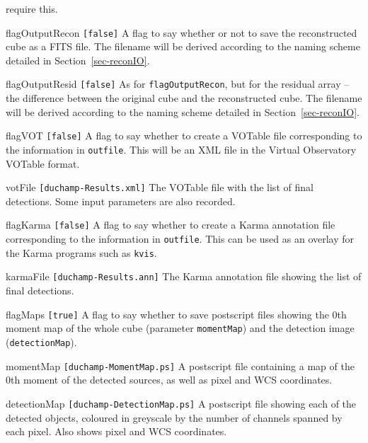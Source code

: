 \begin{entry}
  require this.
\item[flagOutputRecon \texttt{[false]}] A flag to say whether or not
  to save the reconstructed cube as a FITS file. The filename will be
  derived according to the naming scheme detailed in
  Section~\ref{sec-reconIO}.
\item[flagOutputResid \texttt{[false]}] As for
  \texttt{flagOutputRecon}, but for the residual array -- the
  difference between the original cube and the reconstructed cube. The
  filename will be derived according to the naming scheme detailed in
  Section~\ref{sec-reconIO}.
\item[flagVOT \texttt{[false]}] A flag to say whether to create a
  VOTable file corresponding to the information in
  \texttt{outfile}. This will be an XML file in the Virtual
  Observatory VOTable format.
\item[votFile \texttt{[duchamp-Results.xml]}] The VOTable file with
  the list of final detections. Some input parameters are also
  recorded.
\item[flagKarma \texttt{[false]}] A flag to say whether to create a
  Karma annotation file corresponding to the information in
  \texttt{outfile}. This can be used as an overlay for the Karma
  programs such as \texttt{kvis}.
\item[karmaFile \texttt{[duchamp-Results.ann]}] The Karma annotation
  file showing the list of final detections. 
\item[flagMaps \texttt{[true]}] A flag to say whether to save
  postscript files showing the 0th moment map of the whole cube
  (parameter \texttt{momentMap}) and the detection image
  (\texttt{detectionMap}).
\item[momentMap \texttt{[duchamp-MomentMap.ps]}] A postscript file
  containing a map of the 0th moment of the detected sources, as well
  as pixel and WCS coordinates.
\item[detectionMap \texttt{[duchamp-DetectionMap.ps]}] A postscript
  file showing each of the detected objects, coloured in greyscale by
  the number of channels spanned by each pixel. Also shows pixel and
  WCS coordinates.
\end{entry}

